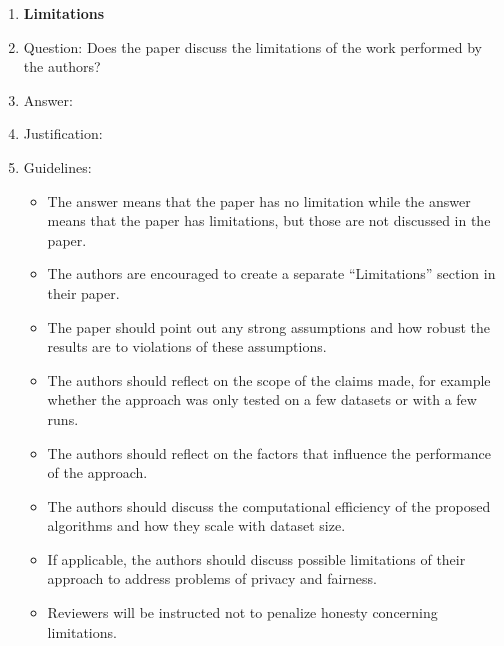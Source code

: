 \begin{enumerate}
\item {\bf Limitations}
    \item[] Question: Does the paper discuss the limitations of the work performed by the authors?
    \item[] Answer: \answerTODO{}
    \item[] Justification: \justificationTODO{}
    \item[] Guidelines:
    \begin{itemize}
        \item The answer \answerNA{} means that the paper has no limitation while the answer \answerNo{} means that the paper has limitations, but those are not discussed in the paper.
        \item The authors are encouraged to create a separate ``Limitations'' section in their paper.
        \item The paper should point out any strong assumptions and how robust the results are to violations of these assumptions.
        \item The authors should reflect on the scope of the claims made, for example whether the approach was only tested on a few datasets or with a few runs.
        \item The authors should reflect on the factors that influence the performance of the approach.
        \item The authors should discuss the computational efficiency of the proposed algorithms and how they scale with dataset size.
        \item If applicable, the authors should discuss possible limitations of their approach to address problems of privacy and fairness.
        \item Reviewers will be instructed not to penalize honesty concerning limitations.
    \end{itemize}


\end{enumerate}

